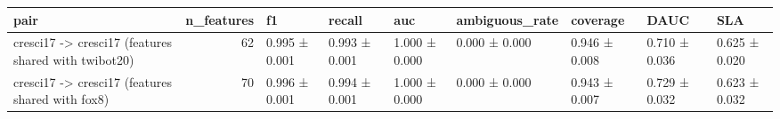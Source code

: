 \begin{tabular}{lrlllllll}
\toprule
pair & n_features & f1 & recall & auc & ambiguous_rate & coverage & DAUC & SLA \\
\midrule
cresci17 -> cresci17 (features shared with twibot20) & 62 & 0.995 ± 0.001 & 0.993 ± 0.001 & 1.000 ± 0.000 & 0.000 ± 0.000 & 0.946 ± 0.008 & 0.710 ± 0.036 & 0.625 ± 0.020 \\
cresci17 -> cresci17 (features shared with fox8) & 70 & 0.996 ± 0.001 & 0.994 ± 0.001 & 1.000 ± 0.000 & 0.000 ± 0.000 & 0.943 ± 0.007 & 0.729 ± 0.032 & 0.623 ± 0.032 \\
\bottomrule
\end{tabular}
